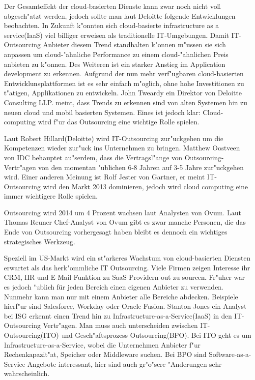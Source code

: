 Der Gesamteffekt der cloud-basierten Dienste kann zwar noch nicht voll abgesch"atzt werden, jedoch sollte man laut Deloitte folgende Entwicklungen beobachten. In Zukunft k"onnten sich cloud-basierte infrastructure as a service(IaaS) viel billiger erweisen als traditionelle IT-Umgebungen. Damit IT-Outsourcing Anbieter diesem Trend standhalten k"onnen m"ussen sie sich anpassen um cloud-"ahnliche Performance zu einem cloud-"ahnlichen Preis anbieten zu k"onnen.
Des Weiteren ist ein starker Anstieg im Application development zu erkennen. Aufgrund der nun mehr verf"ugbaren cloud-basierten Entwicklunsplattformen ist es sehr einfach m"oglich, ohne hohe Investitionen zu t"atigen, Applikationen zu entwickeln.
John Tweardy ein Direktor von Deloitte Consulting LLP. meint, dass Trends zu erkennen sind von alten Systemen hin zu neuen cloud und mobil basierten Systemen. Eines ist jedoch klar: Cloud-computing wird f"ur das Outsourcing eine wichtige Rolle spielen.
\cite{L339}

Laut Robert Hillard(Deloitte) wird IT-Outsourcing zur"uckgehen um die Kompetenzen wieder zur"uck ins Unternehmen zu bringen. Matthew Oostveen von IDC behauptet au"serdem, dass die Vertragsl"ange von Outsourcing-Vertr"agen von den momentan "ublichen 6-8 Jahren auf 3-5 Jahre zur"uckgehen wird.
Einer anderen Meinung ist Rolf Jester von Gartner, er meint IT-Outsourcing wird den Markt 2013 dominieren, jedoch wird cloud computing eine immer wichtigere Rolle spielen.
\cite{341}

Outsourcing wird 2014 um 4 Prozent wachsen laut Analysten von Ovum. Laut Thomas Reuner Chef-Analyst von Ovum gibt es zwar manche Personen, die das Ende von Outsourcing vorhergesagt haben bleibt es dennoch ein wichtiges strategisches Werkzeug.
\cite{OVUM342}

Speziell im US-Markt wird ein st"arkeres Wachstum von cloud-basierten Diensten erwartet als das herk"ommliche IT Outsourcing. Viele Firmen zeigen Interesse ihr CRM, HR und E-Mail Funktion zu SaaS-Providern out zu sourcen. Fr"uher war es jedoch "ublich für jeden Bereich einen eigenen Anbieter zu verwenden. Nunmehr kann man nur mit einem Anbieter alle Bereiche abdecken. Beispiele hierf"ur sind Salesforce, Workday oder Oracle Fusion.
Stanton Jones ein Analyst bei ISG erkennt einen Trend hin zu Infrastructure-as-a-Service(IaaS) in den IT-Outsourcing Vertr"agen. Man muss auch unterscheiden zwischen IT-Outsourcing(ITO) und Gesch"aftsprozess Outsourcing(BPO). Bei ITO geht es um Infrastructure-as-a-Service, wobei die Unternehmen Anbieter f"ur Rechenkapazit"at, Speicher oder Middleware suchen. Bei BPO sind Software-as-a-Service Angebote interessant, hier sind auch gr"o"sere "Anderungen sehr wahrscheinlich.
\cite{ISG17}
